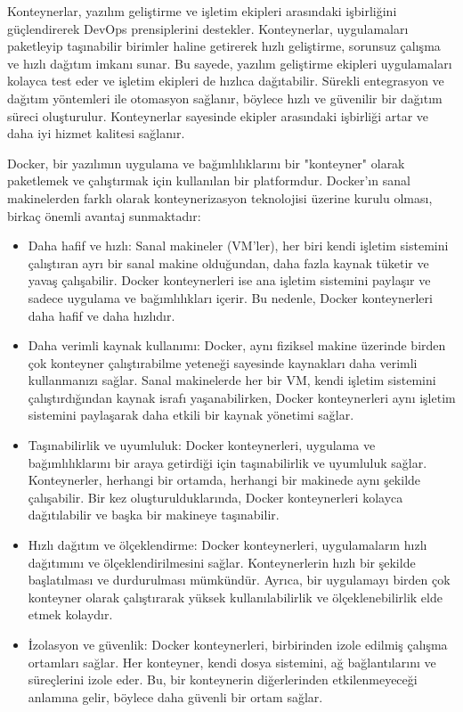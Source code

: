 Konteynerlar, yazılım geliştirme ve işletim ekipleri arasındaki işbirliğini güçlendirerek DevOps prensiplerini destekler. Konteynerlar, uygulamaları paketleyip taşınabilir birimler haline getirerek hızlı geliştirme, sorunsuz çalışma ve hızlı dağıtım imkanı sunar. Bu sayede, yazılım geliştirme ekipleri uygulamaları kolayca test eder ve işletim ekipleri de hızlıca dağıtabilir. Sürekli entegrasyon ve dağıtım yöntemleri ile otomasyon sağlanır, böylece hızlı ve güvenilir bir dağıtım süreci oluşturulur. Konteynerlar sayesinde ekipler arasındaki işbirliği artar ve daha iyi hizmet kalitesi sağlanır.

Docker, bir yazılımın uygulama ve bağımlılıklarını bir "konteyner" olarak paketlemek ve çalıştırmak için kullanılan bir platformdur. Docker'ın sanal makinelerden farklı olarak konteynerizasyon teknolojisi üzerine kurulu olması, birkaç önemli avantaj sunmaktadır:\\
\begin{itemize}
\item Daha hafif ve hızlı: Sanal makineler (VM'ler), her biri kendi işletim sistemini çalıştıran ayrı bir sanal makine olduğundan, daha fazla kaynak tüketir ve yavaş çalışabilir. Docker konteynerleri ise ana işletim sistemini paylaşır ve sadece uygulama ve bağımlılıkları içerir. Bu nedenle, Docker konteynerleri daha hafif ve daha hızlıdır.\\

\item Daha verimli kaynak kullanımı: Docker, aynı fiziksel makine üzerinde birden çok konteyner çalıştırabilme yeteneği sayesinde kaynakları daha verimli kullanmanızı sağlar. Sanal makinelerde her bir VM, kendi işletim sistemini çalıştırdığından kaynak israfı yaşanabilirken, Docker konteynerleri aynı işletim sistemini paylaşarak daha etkili bir kaynak yönetimi sağlar.\\

\item Taşınabilirlik ve uyumluluk: Docker konteynerleri, uygulama ve bağımlılıklarını bir araya getirdiği için taşınabilirlik ve uyumluluk sağlar. Konteynerler, herhangi bir ortamda, herhangi bir makinede aynı şekilde çalışabilir. Bir kez oluşturulduklarında, Docker konteynerleri kolayca dağıtılabilir ve başka bir makineye taşınabilir.\\

\item Hızlı dağıtım ve ölçeklendirme: Docker konteynerleri, uygulamaların hızlı dağıtımını ve ölçeklendirilmesini sağlar. Konteynerlerin hızlı bir şekilde başlatılması ve durdurulması mümkündür. Ayrıca, bir uygulamayı birden çok konteyner olarak çalıştırarak yüksek kullanılabilirlik ve ölçeklenebilirlik elde etmek kolaydır.\\

\item İzolasyon ve güvenlik: Docker konteynerleri, birbirinden izole edilmiş çalışma ortamları sağlar. Her konteyner, kendi dosya sistemini, ağ bağlantılarını ve süreçlerini izole eder. Bu, bir konteynerin diğerlerinden etkilenmeyeceği anlamına gelir, böylece daha güvenli bir ortam sağlar.\\
\end{itemize}
